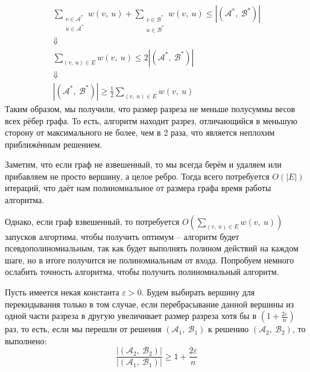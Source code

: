 \documentclass[a4paper,12pt]{article}
\newcommand{\A}{\mathcal{A}}
\newcommand{\B}{\mathcal{B}}
\begin{document}
\begin{gather*}
    \sum\limits_{\substack{v \in \A^*\\u \in \A^*}}w(v,\ u) +  \sum\limits_{\substack{v \in \B^*\\u \in \B^*}}w(v,\ u) \leqslant |(\A^*,\ \B^*)|\\ \Downarrow \\
    \sum\limits_{(v,\ u) \in E}w(v,\ u) \leqslant 2|(\A^*,\ \B^*)| \\ \Downarrow \\
    |(\A^*,\ \B^*)| \geqslant \frac{1}{2}\sum\limits_{(v,\ u) \in E}w(v,\ u)
\end{gather*}
Таким образом, мы получили, что размер разреза не меньше полусуммы весов всех рёбер графа. То есть, алгоритм находит разрез, отличающийся в меньшую сторону от максимального не более, чем в 2 раза, что является неплохим приближённым решением.

Заметим, что если граф не взвешенный, то мы всегда берём и удаляем или прибавляем не просто вершину, а целое ребро. Тогда всего потребуется $O(|E|)$ итераций, что даёт нам полиномиальное от размера графа время работы алгоритма.

Однако, если граф взвешенный, то потребуется $O\left(\sum\limits_{(v,\ u) \in E}w(v,\ u)\right)$ запусков алгортима, чтобы получить оптимум -- алгоритм будет псевдополиномиальным, так как будет выполнять полином действий на каждом шаге, но в итоге получится не полиномиальным от входа. Попробуем немного ослабить точность алгоритма, чтобы получить полиномиальный алгоритм.

Пусть имеется некая константа $\varepsilon > 0$. Будем выбирать вершину для перекидывания только в том случае, если перебрасывание данной вершины из одной части разреза в другую увеличивает размер разреза хотя бы в $\left(1 + \displaystyle\frac{2\varepsilon}{n}\right)$ раз, то есть, если мы перешли от решения $(\A_1,\ \B_1)$ к решению $(\A_2,\ \B_2)$, то выполнено:
\[\displaystyle\frac{|(\A_2,\ \B_2)|}{|(\A_1,\ \B_1)|} \geqslant 1 + \displaystyle\frac{2\varepsilon}{n}\]
\end{document}

